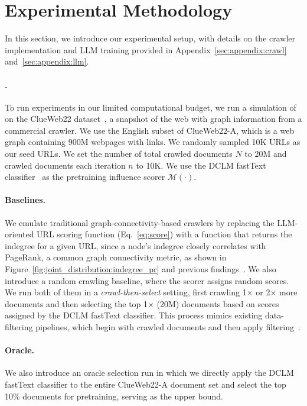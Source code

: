 \section{Experimental Methodology}
\label{sec:experimental_method}

In this section, we introduce our experimental setup, with details on the crawler implementation and LLM training provided in Appendix~\ref{sec:appendix:crawl} and~\ref{sec:appendix:llm}.


\paragraph{\ours{}.}
To run experiments in our limited computational budget, we run a simulation of \ours{} on the ClueWeb22 dataset~\citep{clueweb22}, a snapshot of the web with graph information from a commercial crawler.
We use the English subset of ClueWeb22-A, which is a web graph containing 900M webpages with links.
We randomly sampled 10K URLs as our seed URLs.
We set the number of total crawled documents $N$ to 20M and crawled documents each iteration $n$ to 10K.
We use the DCLM fastText classifier~\citep{dclm} as the pretraining influence scorer $\mathcal{M}(\cdot)$.



\paragraph{Baselines.} 
We emulate traditional graph-connectivity-based crawlers by replacing the LLM-oriented URL scoring function (Eq.~\ref{eq:score}) with a function that returns the indegree for a given URL, since a node's indegree closely correlates with PageRank, a common graph connectivity metric, as shown in Figure~\ref{fig:joint_distribution:indegree_pr} and previous findings~\citep{pr-and-indegree}.
We also introduce a random crawling baseline, where the scorer assigns random scores.
We run both of them in a \textit{crawl-then-select} setting, first crawling 1× or 2× more documents and then selecting the top 1× (20M) documents based on scores assigned by the DCLM fastText classifier.
This process mimics existing data-filtering pipelines, which begin with crawled documents and then apply filtering~\citep{dclm,fineweb}.

\paragraph{Oracle.}
We also introduce an oracle selection run in which we directly apply the DCLM fastText classifier to the entire ClueWeb22-A document set and select the top 10\% documents for pretraining, serving as the upper bound.

